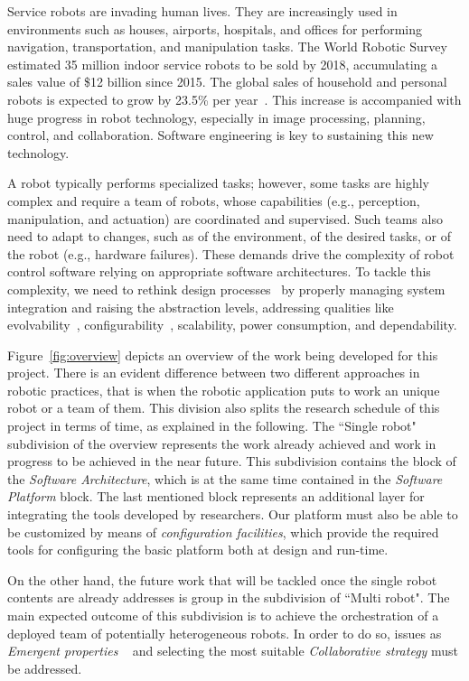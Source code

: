 Service robots are invading human lives. They are increasingly used in environments such as houses, airports, hospitals, and offices for performing navigation, transportation, and manipulation tasks. 
The World Robotic Survey~\cite{wrs:online} estimated 35 million indoor service robots to be sold by 2018, accumulating a sales value of \$12 billion since 2015. 
The global sales of household and personal robots is expected to grow by 23.5\% per year~\cite{sheng:online}. 
This increase is accompanied with huge progress in robot technology, especially in image processing, planning, control, and collaboration. Software engineering is key to sustaining this new technology.

A robot typically performs specialized tasks; however, some tasks are highly complex and require a team of robots, whose capabilities (e.g., perception, manipulation, and actuation) are coordinated and supervised. 
Such teams also need to adapt to changes, such as of the environment, of the desired tasks, or of the robot (e.g., hardware failures). 
These demands drive the complexity of robot control software relying on appropriate software architectures. 
To tackle this complexity, we need to rethink design processes~\cite{Lee2008} by properly managing system integration and raising the abstraction levels, addressing qualities like evolvability~\cite{Perez2008}, configurability~\cite{Gamez2013563}, scalability, power consumption, and dependability.

Figure~\ref{fig:overview} depicts an overview of the work being developed for this project.
There is an evident difference between two different approaches in robotic practices, that is when the robotic application puts to work an unique robot or a team of them. 
This division also splits the research schedule of this project in terms of time, as explained in the following.
The ``Single robot" subdivision of the overview represents the work already achieved and work in progress to be achieved in the near future.
This subdivision contains the block of the \emph{Software Architecture}, which is at the same time contained in the \emph{Software Platform} block.
The last mentioned block represents an additional layer for integrating the tools developed by researchers.
Our platform must also be able to be customized by means of \emph{configuration facilities}, which provide the required tools for configuring the basic platform both at design and run-time.

On the other hand, the future work that will be tackled once the single robot contents are already addresses is group in the subdivision of ``Multi robot".
The main expected outcome of this subdivision is to achieve the orchestration of a deployed team of potentially heterogeneous robots.
In order to do so, issues as \emph{Emergent properties} ~\cite{DeAngelis2015,DeAngelis2016} and selecting the most suitable \emph{Collaborative strategy}  must be addressed.

